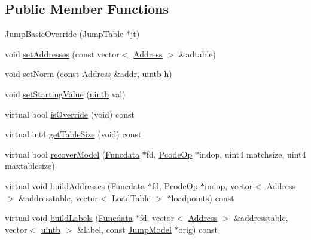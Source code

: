 \subsection*{Public Member Functions}
\begin{DoxyCompactItemize}
\item 
\mbox{\hyperlink{class_jump_basic_override_aaae11fe384046c2f59bd4dd46f9c5a89}{Jump\+Basic\+Override}} (\mbox{\hyperlink{class_jump_table}{Jump\+Table}} $\ast$jt)
\item 
void \mbox{\hyperlink{class_jump_basic_override_add96a354fac8785292195cb321899544}{set\+Addresses}} (const vector$<$ \mbox{\hyperlink{class_address}{Address}} $>$ \&adtable)
\item 
void \mbox{\hyperlink{class_jump_basic_override_ac3155afbfd9517e3e5653d56e6cd1d67}{set\+Norm}} (const \mbox{\hyperlink{class_address}{Address}} \&addr, \mbox{\hyperlink{types_8h_a2db313c5d32a12b01d26ac9b3bca178f}{uintb}} h)
\item 
void \mbox{\hyperlink{class_jump_basic_override_a3ab3067a1835d692e3ac52b545ff2a7f}{set\+Starting\+Value}} (\mbox{\hyperlink{types_8h_a2db313c5d32a12b01d26ac9b3bca178f}{uintb}} val)
\item 
virtual bool \mbox{\hyperlink{class_jump_basic_override_a5ab5ce54ef01c3839fe62f97c967cbd2}{is\+Override}} (void) const
\item 
virtual int4 \mbox{\hyperlink{class_jump_basic_override_a49b889abc5b5f57fe22b6cbc17e03f64}{get\+Table\+Size}} (void) const
\item 
virtual bool \mbox{\hyperlink{class_jump_basic_override_a4fd706bf7ee1023bd1d93c78ba66852f}{recover\+Model}} (\mbox{\hyperlink{class_funcdata}{Funcdata}} $\ast$fd, \mbox{\hyperlink{class_pcode_op}{Pcode\+Op}} $\ast$indop, uint4 matchsize, uint4 maxtablesize)
\item 
virtual void \mbox{\hyperlink{class_jump_basic_override_ad9a026df124c7e57722bdc1903033ebb}{build\+Addresses}} (\mbox{\hyperlink{class_funcdata}{Funcdata}} $\ast$fd, \mbox{\hyperlink{class_pcode_op}{Pcode\+Op}} $\ast$indop, vector$<$ \mbox{\hyperlink{class_address}{Address}} $>$ \&addresstable, vector$<$ \mbox{\hyperlink{class_load_table}{Load\+Table}} $>$ $\ast$loadpoints) const
\item 
virtual void \mbox{\hyperlink{class_jump_basic_override_a1fff9a672edb2225dae051d7ed6b57b5}{build\+Labels}} (\mbox{\hyperlink{class_funcdata}{Funcdata}} $\ast$fd, vector$<$ \mbox{\hyperlink{class_address}{Address}} $>$ \&addresstable, vector$<$ \mbox{\hyperlink{types_8h_a2db313c5d32a12b01d26ac9b3bca178f}{uintb}} $>$ \&label, const \mbox{\hyperlink{class_jump_model}{Jump\+Model}} $\ast$orig) const

\end{DoxyCompactItemize}
